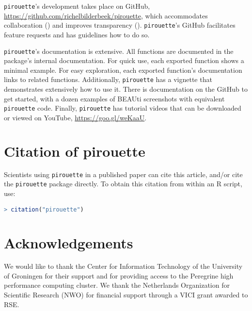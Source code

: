 \documentclass{article}
\begin{document}
\verb;pirouette;'s development takes place on GitHub,
\url{https://github.com/richelbilderbeek/pirouette}, 
which accommodates collaboration (\cite{perez2016ten}) 
and improves transparency (\cite{gorgolewski2016practical}).
\verb;pirouette;'s GitHub facilitates feature requests and 
has guidelines how to do so.

\verb;pirouette;'s documentation is extensive. All functions are documented
in the package's internal documentation. For quick use, 
each exported function shows a minimal example. 
For easy exploration, each exported function's documentation links to related functions.
Additionally, \verb;pirouette; has a vignette that demonstrates extensively how
to use it. There is documentation on the GitHub to get started, 
with a dozen examples of BEAUti screenshots with equivalent \verb;pirouette; code.
Finally, \verb;pirouette; has tutorial videos that can 
be downloaded or viewed on YouTube, \url{https://goo.gl/weKaaU}.

\section{Citation of pirouette}

Scientists using \verb;pirouette; in a published paper can cite this
article, and/or cite the \verb;pirouette; package 
directly. To obtain this citation from within an R script, use:

\begin{lstlisting}[language=R]
> citation("pirouette")
\end{lstlisting}

\section{Acknowledgements}

We would like to thank the Center for Information Technology of the University 
of Groningen for their support and for providing access to the Peregrine 
high performance computing cluster. 
We thank the Netherlands 
Organization for Scientific Research (NWO) for financial support 
through a VICI grant awarded to RSE.
\end{document}
